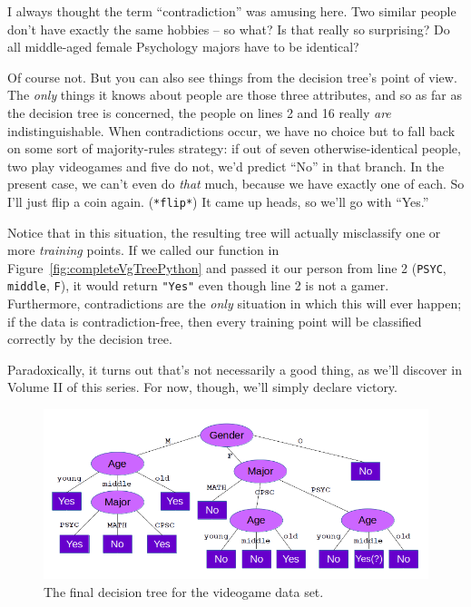 I always thought the term ``contradiction'' was amusing here. Two similar
people don't have exactly the same hobbies -- so what? Is that really so
surprising? Do all middle-aged female Psychology majors have to be identical?

Of course not. But you can also see things from the decision tree's point of
view. The \textit{only} things it knows about people are those three
attributes, and so as far as the decision tree is concerned, the people on
lines 2 and 16 really \textit{are} indistinguishable. When contradictions
occur, we have no choice but to fall back on some sort of majority-rules
strategy: if out of seven otherwise-identical people, two play videogames and
five do not, we'd predict ``No'' in that branch. In the present case, we can't
even do \textit{that} much, because we have exactly one of each. So I'll just
flip a coin again. (\texttt{*flip*}) It came up heads, so we'll go with
``Yes.''

Notice that in this situation, the resulting tree will actually misclassify one
or more \textit{training} points. If we called our function in
Figure~\ref{fig:completeVgTreePython} and passed it our person from line 2
(\texttt{\textquotesingle PSYC\textquotesingle}, \texttt{\textquotesingle
middle\textquotesingle}, \texttt{\textquotesingle F\textquotesingle}), it would
return \texttt{"Yes"} even though line 2 is not a gamer. Furthermore,
contradictions are the \textit{only} situation in which this will ever happen;
if the data is contradiction-free, then every training point will be classified
correctly by the decision tree.

Paradoxically, it turns out that's not necessarily a good thing, as we'll
discover in Volume II of this series. For now, though, we'll simply declare
victory.

\begin{figure}[ht]
\centering
\includegraphics[width=1\textwidth]{completeVgTree.png}
\caption{The final decision tree for the videogame data set.}
\label{fig:completeVgTree}
\end{figure}

